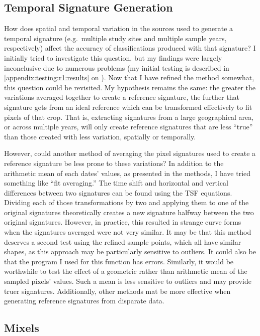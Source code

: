 \subsection{Temporal Signature Generation}

How does spatial and temporal variation in the sources used to generate a temporal signature (e.g.\ multiple study sites and multiple sample years, respectively) affect the accuracy of classifications produced with that signature? I initially tried to investigate this question, but my findings were largely inconclusive due to numerous problems (my initial testing is described in \autoref{appendix:testing:r1:results} on ). Now that I have refined the method somewhat, this question could be revisited. My hypothesis remains the same: the greater the variations averaged together to create a reference signature, the further that signature gets from an ideal reference which can be transformed effectively to fit pixels of that crop. That is, extracting signatures from a large geographical area, or across multiple years, will only create reference signatures that are less ``true'' than those created with less variation, spatially or temporally.

However, could another method of averaging the pixel signatures used to create a reference signature be less prone to these variations? In addition to the arithmetic mean of each dates' values, as presented in the methods, I have tried something like “fit averaging.” The time shift and horizontal and vertical differences between two signatures can be found using the TSF equations. Dividing each of those transformations by two and applying them to one of the original signatures theoretically creates a new signature halfway between the two original signatures. However, in practice, this resulted in strange curve forms when the signatures averaged were not very similar. It may be that this method deserves a second test using the refined sample points, which all have similar shapes, as this approach may be particularly sensitive to outliers. It could also be that the program I used for this function has errors. Similarly, it would be worthwhile to test the effect of a geometric rather than arithmetic mean of the sampled pixels’ values. Such a mean is less sensitive to outliers and may provide truer signatures. Additionally, other methods mat be more effective when generating reference signatures from disparate data. 

\subsection{Mixels}

